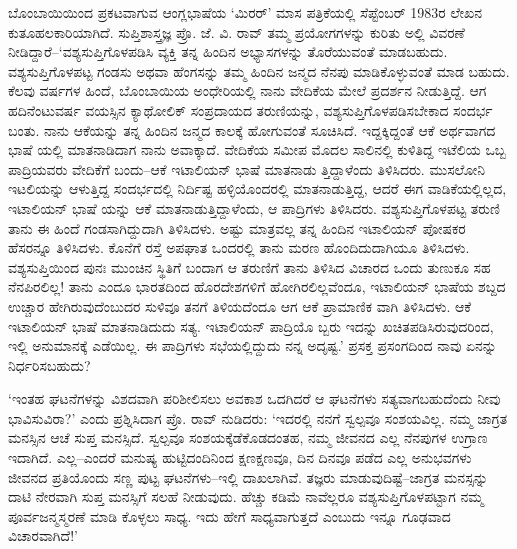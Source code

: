 ಬೊಂಬಾಯಿಯಿಂದ ಪ್ರಕಟವಾಗುವ ಆಂಗ್ಲಭಾಷೆಯ ‘ಮಿರರ್​’ ಮಾಸ ಪತ್ರಿಕೆಯಲ್ಲಿ ಸೆಪ್ಟೆಂಬರ್ 1983ರ ಲೇಖನ ಕುತೂಹಲಕಾರಿಯಾಗಿದೆ. ಸುಪ್ತಿಶಾಸ್ತ್ರಜ್ಞ ಪ್ರೊ. ಜೆ. ವಿ. ರಾವ್ ತಮ್ಮ ಪ್ರಯೋಗಗಳನ್ನು ಕುರಿತು ಅಲ್ಲಿ ವಿವರಣೆ ನೀಡಿದ್ದಾರೆ–‘ವಶ್ಯಸುಪ್ತಿಗೊಳಪಡಿಸಿ ವ್ಯಕ್ತಿ ತನ್ನ ಹಿಂದಿನ ಅಭ್ಯಾಸಗಳನ್ನು ತೊರೆಯುವಂತೆ ಮಾಡಬಹುದು. ವಶ್ಯಸುಪ್ತಿಗೊಳಪಟ್ಟ ಗಂಡಸು ಅಥವಾ ಹೆಂಗಸನ್ನು ತಮ್ಮ ಹಿಂದಿನ ಜನ್ಮದ ನೆನಪು ಮಾಡಿಕೊಳ್ಳುವಂತೆ ಮಾಡ ಬಹುದು. ಕೆಲವು ವರ್ಷಗಳ ಹಿಂದೆ, ಬೊಂಬಾಯಿಯ ಅಂಧೇರಿಯಲ್ಲಿ ನಾನು ವೇದಿಕೆಯ ಮೇಲೆ ಪ್ರದರ್ಶನ ನೀಡುತ್ತಿದ್ದೆ. ಆಗ ಹದಿನೆಂಟುವರ್ಷ ವಯಸ್ಸಿನ ಕ್ಯಾಥೋಲಿಕ್ ಸಂಪ್ರದಾಯದ ತರುಣಿಯನ್ನು, ವಶ್ಯಸುಪ್ತಿಗೊಳಪಡಿಸಬೇಕಾದ ಸಂದರ್ಭ ಬಂತು. ನಾನು ಆಕೆಯನ್ನು ತನ್ನ ಹಿಂದಿನ ಜನ್ಮದ ಕಾಲಕ್ಕೆ ಹೋಗುವಂತೆ ಸೂಚಿಸಿದೆ. ಇದ್ದಕ್ಕಿದ್ದಂತೆ ಆಕೆ ಅರ್ಥವಾಗದ ಭಾಷೆ ಯಲ್ಲಿ ಮಾತನಾಡಿದಾಗ ನಾನು ಅವಾಕ್ಕಾದೆ. ವೇದಿಕೆಯ ಸಮೀಪ ಮೊದಲ ಸಾಲಿನಲ್ಲಿ ಕುಳಿತಿದ್ದ ಇಟೆಲಿಯ ಒಬ್ಬ ಪಾದ್ರಿಯವರು ವೇದಿಕೆಗೆ ಬಂದು–ಆಕೆ ಇಟಾಲಿಯನ್ ಭಾಷೆ ಮಾತನಾಡು ತ್ತಿದ್ದಾಳೆಂದು ತಿಳಿಸಿದರು. ಮುಸಲೋನಿ ಇಟಲಿಯನ್ನು ಆಳುತ್ತಿದ್ದ ಸಂದರ್ಭದಲ್ಲಿ ನಿರ್ದಿಷ್ಟ ಹಳ್ಳಿಯೊಂದರಲ್ಲಿ ಮಾತನಾಡುತ್ತಿದ್ದ, ಆದರೆ ಈಗ ವಾಡಿಕೆಯಲ್ಲಿಲ್ಲದ, ಇಟಾಲಿಯನ್ ಭಾಷೆ ಯನ್ನು ಆಕೆ ಮಾತನಾಡುತ್ತಿದ್ದಾಳೆಂದು, ಆ ಪಾದ್ರಿಗಳು ತಿಳಿಸಿದರು. ವಶ್ಯಸುಪ್ತಿಗೊಳಪಟ್ಟ ತರುಣಿ ತಾನು ಈ ಹಿಂದೆ ಗಂಡಸಾಗಿದ್ದುದಾಗಿ ತಿಳಿಸಿದಳು. ಅಷ್ಟು ಮಾತ್ರವಲ್ಲ ತನ್ನ ಹಿಂದಿನ ಇಟಾಲಿಯನ್ ಪೋಷಕರ ಹೆಸರನ್ನೂ ತಿಳಿಸಿದಳು. ಕೊನೆಗೆ ರಸ್ತೆ ಅಪಘಾತ ಒಂದರಲ್ಲಿ ತಾನು ಮರಣ ಹೊಂದಿದುದಾಗಿಯೂ ತಿಳಿಸಿದಳು. ವಶ್ಯಸುಪ್ತಿಯಿಂದ ಪುನಃ ಮುಂಚಿನ ಸ್ಥಿತಿಗೆ ಬಂದಾಗ ಆ ತರುಣಿಗೆ ತಾನು ತಿಳಿಸಿದ ವಿಚಾರದ ಒಂದು ತುಣುಕೂ ಸಹ ನೆನಪಿರಲಿಲ್ಲ! ತಾನು ಎಂದೂ ಭಾರತದಿಂದ ಹೊರದೇಶಗಳಿಗೆ ಹೋಗಿರಲಿಲ್ಲವೆಂದೂ, ಇಟಾಲಿಯನ್ ಭಾಷೆಯ ಶಬ್ದದ ಉಚ್ಚಾರ ಹೇಗಿರುವುದೆಂಬುದರ ಸುಳಿವೂ ತನಗೆ ತಿಳಿಯದೆಂದೂ ಆಗ ಆಕೆ ಪ್ರಾಮಾಣಿಕ ವಾಗಿ ತಿಳಿಸಿದಳು. ಆಕೆ ಇಟಾಲಿಯನ್ ಭಾಷೆ ಮಾತನಾಡಿದುದು ಸತ್ಯ. ಇಟಾಲಿಯನ್ ಪಾದ್ರಿಯೊ ಬ್ಬರು ಇದನ್ನು ಖಚಿತಪಡಿಸಿರುವುದರಿಂದ, ಇಲ್ಲಿ ಅನುಮಾನಕ್ಕೆ ಎಡೆಯಿಲ್ಲ. ಈ ಪಾದ್ರಿಗಳು ಸಭೆಯಲ್ಲಿದ್ದುದು ನನ್ನ ಅದೃಷ್ಟ.’ ಪ್ರಸಕ್ತ ಪ್ರಸಂಗದಿಂದ ನಾವು ಏನನ್ನು ನಿರ್ಧರಿಸಬಹುದು?

‘ಇಂತಹ ಘಟನೆಗಳನ್ನು ವಿಶದವಾಗಿ ಪರಿಶೀಲಿಸಲು ಅವಕಾಶ ಒದಗಿದರೆ ಆ ಘಟನೆಗಳು ಸತ್ಯವಾಗಬಹುದೆಂದು ನೀವು ಭಾವಿಸುವಿರಾ?’ ಎಂದು ಪ್ರಶ್ನಿಸಿದಾಗ ಪ್ರೊ. ರಾವ್ ನುಡಿದರು: ‘ಇದರಲ್ಲಿ ನನಗೆ ಸ್ವಲ್ಪವೂ ಸಂಶಯವಿಲ್ಲ. ನಮ್ಮ ಜಾಗ್ರತ ಮನಸ್ಸಿನ ಆಚೆ ಸುಪ್ತ ಮನಸ್ಸಿದೆ. ಸ್ವಲ್ಪವೂ ಸಂಶಯಕ್ಕೆಡೆಕೊಡದಂತಹ, ನಮ್ಮ ಜೀವನದ ಎಲ್ಲ ನೆನಪುಗಳ ಉಗ್ರಾಣ ಇದಾಗಿದೆ. ಎಲ್ಲ–ಎಂದರೆ ಮನುಷ್ಯ ಹುಟ್ಟಿದಂದಿನಿಂದ ಕ್ಷಣಕ್ಷಣವೂ, ದಿನ ದಿನವೂ ಪಡೆದ ಎಲ್ಲ ಅನುಭವಗಳು ಜೀವನದ ಪ್ರತಿಯೊಂದು ಸಣ್ಣ ಪುಟ್ಟ ಘಟನೆಗಳು–ಇಲ್ಲಿ ದಾಖಲಾಗಿವೆ. ತಜ್ಞರು ಮಾಡುವುದಿಷ್ಟೆ–ಜಾಗ್ರತ ಮನಸ್ಸನ್ನು ದಾಟಿ ನೇರವಾಗಿ ಸುಪ್ತ ಮನಸ್ಸಿಗೆ ಸಲಹೆ ನೀಡುವುದು. ಹೆಚ್ಚು ಕಡಿಮೆ ನಾವೆಲ್ಲರೂ ವಶ್ಯಸುಪ್ತಿಗೊಳಪಟ್ಟಾಗ ನಮ್ಮ ಪೂರ್ವಜನ್ಮಸ್ಮರಣೆ ಮಾಡಿ ಕೊಳ್ಳಲು ಸಾಧ್ಯ. ಇದು ಹೇಗೆ ಸಾಧ್ಯವಾಗುತ್ತದೆ ಎಂಬುದು ಇನ್ನೂ ಗೂಢವಾದ ವಿಚಾರವಾಗಿದೆ!’

